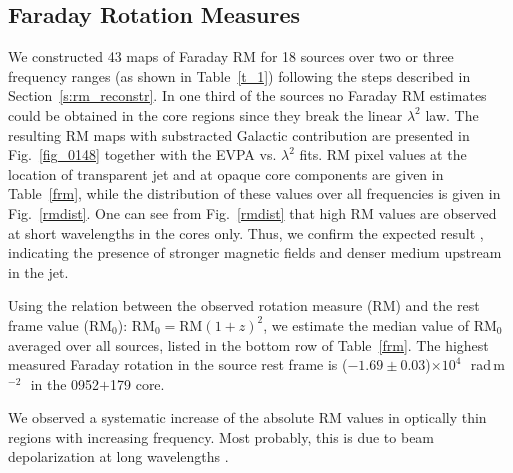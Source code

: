 \documentclass[a4paper,fleqn,usenatbib,useAMS]{mnras}
\newcommand{\rmu}{\,rad\,m$^{-2}$\,} %
\begin{document}
\subsection{Faraday Rotation Measures}
\label{s:frm}
We constructed 43 maps of Faraday RM for 18 sources over two or three frequency ranges (as shown in Table~\ref{t_1}) following the steps described in Section~\ref{s:rm_reconstr}. In one third of the sources no Faraday RM estimates could be obtained in the core regions since they break the linear $\lambda^2$ law.
The resulting RM maps with substracted Galactic contribution are presented in Fig.~\ref{fig_0148} together with the EVPA vs. $\lambda^2$ fits.
RM pixel values at the location of transparent jet and at opaque core components are given in Table~\ref{frm}, while the distribution of these values over all frequencies is given in Fig.~\ref{rmdist}.
One can see from Fig.~\ref{rmdist} that high RM values are observed at short wavelengths in the cores only. Thus, we confirm the expected result \citep[e.g.][]{trippe_etal12}, indicating the presence of stronger magnetic fields and denser medium upstream in the jet. 

Using the relation between the observed rotation measure (RM) and the rest frame value ($\mathrm{RM}_0$):
$\mathrm{RM}_0=\mathrm{RM}(1+z)^2$, we estimate the median value of $\mathrm{RM}_0$ averaged over all sources, listed in the bottom row of Table~\ref{frm}.
The highest measured Faraday rotation in the source rest frame is ($-1.69\pm0.03$)$\times10^4$~\rmu\ in the 0952$+$179 core.

We observed a systematic increase of the absolute RM values in optically thin regions with increasing frequency.
Most probably, this is due to beam depolarization at long wavelengths \citep[see simulations by][]{2011ApJ...737...42P}.
\end{document}
